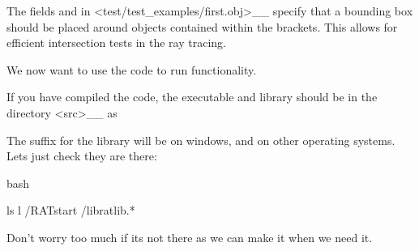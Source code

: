 \documentclass[letterpaper,10pt,english]{sphinxmanual}
\begin{document}
The fields \sphinxcode{\sphinxupquote{!\{}} and \sphinxcode{\sphinxupquote{!\}}} in  \textless{}test/test\_examples/first.obj\textgreater{}\textasciigrave{}\_\_ specify that a bounding box should be placed around objects contained within the brackets. This allows for efficient intersection tests in the ray tracing.

We now want to use the code  to run  functionality.

If you have compiled the code, the executable and library should be in the directory  \textless{}src\textgreater{}\textasciigrave{}\_\_ as

\begin{sphinxVerbatim}[commandchars=\\\{\}]
\PYG{p}{[}\PYG{p}{]}
\end{sphinxVerbatim}

The suffix for the library will be  on windows, and  on other operating systems. Lets just check they are there:

{
\begin{sphinxVerbatim}[commandchars=\\\{\}]
\llap{\color{nbsphinxin}[ ]:\,\hspace{\fboxrule}\hspace{\fboxsep}}\PYGZpc{}\PYGZpc{}bash


ls \PYGZhy{}l /RATstart /libratlib.*
\end{sphinxVerbatim}
}

Don’t worry too much if its not there as we can make it when we need it.
\end{document}
